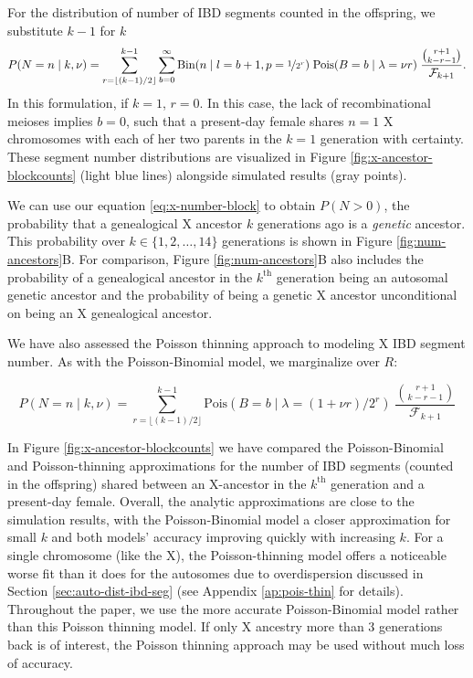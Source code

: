 \documentclass[11pt]{article}
\begin{document}
For the distribution of number of IBD segments counted in the offspring, we
substitute $k-1$ for $k$
\begin{equation}
  \label{eq:x-number-block}
  P(N=n \;|\; k, \nu) = \sum_{r=\lfloor (k-1)/2 \rfloor}^{k-1} \sum_{b=0}^\infty \text{Bin}(n \;|\; l=b+1, p=\nicefrac{1}{2^r}) \; \text{Pois}(B=b \;|\; \lambda=\nu r) \; \frac{{r+1 \choose k-r-1}}{\mathcal{F}_{k+1}}.
\end{equation}
%
In this formulation, if $k=1$, $r = 0$. In this case, the lack of
recombinational meioses implies $b=0$, such that a present-day female shares
$n=1$ X chromosomes with each of her two parents in the $k=1$ generation with
certainty. These segment number distributions are visualized in Figure
\ref{fig:x-ancestor-blockcounts} (light blue lines) alongside simulated results
(gray points).

We can use our equation \eqref{eq:x-number-block} to obtain $P(N > 0)$, the
probability that a genealogical X ancestor $k$ generations ago is a
\emph{genetic} ancestor. This probability over $k \in \{1, 2, \ldots, 14\}$
generations is shown in Figure \ref{fig:num-ancestors}B. For comparison, Figure
\ref{fig:num-ancestors}B also includes the probability of a genealogical
ancestor in the $k^\text{th}$ generation being an autosomal genetic ancestor
and the probability of being a genetic X ancestor unconditional on being an X
genealogical ancestor. 

We have also assessed the Poisson thinning approach to modeling X IBD segment
number. As with the Poisson-Binomial model, we marginalize over $R$:

\begin{equation}
  \label{eq:x-number-block-thinned}
  P(N=n \;|\; k, \nu) = \sum_{r=\lfloor (k-1)/2 \rfloor}^{k-1} \text{Pois}(B=b \;|\; \lambda=(1 + \nu r)/2^r) \; \frac{{r+1 \choose k-r-1}}{\mathcal{F}_{k+1}}
\end{equation}

In Figure \ref{fig:x-ancestor-blockcounts} we have compared the
Poisson-Binomial and Poisson-thinning approximations for the number of IBD
segments (counted in the offspring) shared between an X-ancestor in the
$k^\text{th}$ generation and a present-day female. Overall, the analytic
approximations are close to the simulation results, with the Poisson-Binomial
model a closer approximation for small $k$ and both models' accuracy improving
quickly with increasing $k$.  For a single chromosome (like the X), the
Poisson-thinning model offers a noticeable worse fit than it does for the
autosomes due to overdispersion discussed in Section
\ref{sec:auto-dist-ibd-seg} (see Appendix \ref{ap:pois-thin} for details).
Throughout the paper, we use the more accurate Poisson-Binomial model rather
than this Poisson thinning model. If only X ancestry more than 3 generations
back is of interest, the Poisson thinning approach may be used without much
loss of accuracy.
\end{document}
